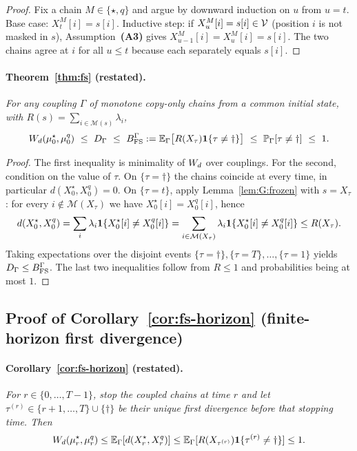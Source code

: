 \begin{proof}
Fix a chain $M\in\{\star,q\}$ and argue by downward induction on $u$ from $u=t$. Base case:
$X^{M}_{t}[i]=s[i]$. Inductive step: if $X^{M}_{u}[i]=s[i]\in\mathcal{V}$ (position $i$ is not masked in $s$), Assumption~\textbf{(A3)} gives
$X^{M}_{u-1}[i]=X^{M}_{u}[i]=s[i]$. The two chains agree at $i$ for all $u\le t$ because each separately equals $s[i]$.
\end{proof}

\paragraph{Theorem~\ref{thm:fs} (restated).}
\emph{For any coupling $\Gamma$ of monotone copy-only chains from a common initial state, with
$R(s)=\sum_{i\in\mathcal{M}(s)}\lambda_{i}$,}
\[
\Wd(\mu^{\star}_{0},\mu^{q}_{0})\ \le\ D_{\Gamma}\ \le\
\Bfs^{\Gamma}:=\Ex_{\Gamma}\big[R(X_{\tau})\Ind{\tau\neq\dagger}\big]\ \le\
\Pr_{\Gamma}[\tau\neq\dagger]\ \le\ 1 .
\]

\begin{proof}
The first inequality is minimality of $W_{d}$ over couplings. For the second, condition on the value
of $\tau$. On $\{\tau=\dagger\}$ the chains coincide at every time, in particular
$d(X^{\star}_{0},X^{q}_{0})=0$. On $\{\tau=t\}$, apply Lemma~\ref{lem:G:frozen} with
$s=X_{\tau}$: for every $i\notin\mathcal{M}(X_{\tau})$ we have
$X^{\star}_{0}[i]=X^{q}_{0}[i]$, hence
\[
d(X^{\star}_{0},X^{q}_{0})
=\sum_{i}\lambda_{i}\mathbf{1}\{X^{\star}_{0}[i]\neq X^{q}_{0}[i]\}
=\sum_{i\in\mathcal{M}(X_{\tau})}\lambda_{i}\mathbf{1}\{X^{\star}_{0}[i]\neq X^{q}_{0}[i]\}
\le R(X_{\tau}).
\]
Taking expectations over the disjoint events $\{\tau=\dagger\},\{\tau=T\},\dots,\{\tau=1\}$
yields $D_{\Gamma}\le B_{\mathrm{FS}}^{\Gamma}$. The last two inequalities follow from $R\le1$ and
probabilities being at most $1$.
\end{proof}

\subsection{Proof of Corollary~\ref{cor:fs-horizon} (finite-horizon first divergence)}
\label{app:proofs:fs-horizon}

\paragraph{Corollary~\ref{cor:fs-horizon} (restated).}
\emph{For $r\in\{0,\dots,T-1\}$, stop the coupled chains at time $r$ and let
$\tau^{(r)}\in\{r+1,\dots,T\}\cup\{\dagger\}$ be their unique first divergence before that
stopping time. Then}
\[
W_{d}(\mu_r^\star,\mu_r^q)
\le \mathbb{E}_\Gamma[d(X_r^\star,X_r^q)]
\le \mathbb{E}_\Gamma[R(X_{\tau^{(r)}})\mathbf{1}\{\tau^{(r)}\neq\dagger\}]
\le1.
\]

